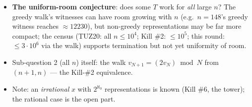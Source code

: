 \documentclass{article}
\begin{document}
\begin{itemize}
\item \textbf{The uniform-room conjecture}: does some $T$ work for
\emph{all} large $n$?  The greedy walk's witnesses can have room growing
with $n$ (e.g.\ $n = 148$'s greedy witness reaches $\approx 12230$), but
non-greedy representations may be far more compact; the census
(TUZ20: all $n \le 10^4$; Kill \#2: $\le 10^5$; this round: $\le 3\cdot10^6$
via the walk) supports termination but not yet uniformity of room.
\item Sub-question 2 (all $n$) itself: the walk
$v_{N+1} = (2v_N) \bmod N$ from $(n+1, n)$ — the Kill-\#2 equivalence.
\item Note: an \emph{irrational} $x$ with $2^{\aleph_0}$ representations is
known (Kill \#6, the tower); the rational case is the open part.
\end{itemize}
\end{document}
